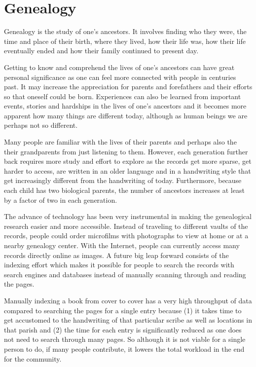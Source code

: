 
\section{Genealogy}

Genealogy is the study of one's ancestors. It involves finding who they were, the time and place of their birth, where they lived, how their life was, how their life eventually ended and how their family continued to present day.

Getting to know and comprehend the lives of one's ancestors can have great personal significance as one can feel more connected with people in centuries past. It may increase the appreciation for parents and forefathers and their efforts so that oneself could be born.
Experiences can also be learned from important events, stories and hardships in the lives of one's ancestors and
it becomes more apparent
how many things are different today, although as human beings we are perhaps not so different.

Many people are familiar with the lives of their parents and perhaps also the their grandparents from just listening to them.
However, each generation further back requires more study and effort to explore as the records get more sparse, get harder to access, are written in an older language and in a handwriting style that get increasingly different from the handwriting of today. Furthermore, because each child has two biological parents, the number of ancestors increases at least by a factor of two in each generation.

The advance of technology has been very instrumental in making the genealogical research easier and more accessible. Instead of traveling to different vaults of the records, people could order microfilms with photographs to view at home or at a nearby genealogy center. With the Internet, people can currently access many records directly online as images. A future big leap forward consists of the indexing effort which makes it possible for people to search the records with search engines and databases instead of manually scanning through and reading the pages.

Manually indexing a book from cover to cover has a very high throughput of data compared to searching the pages for a single entry because (1) it takes time to get accustomed to the handwriting of that particular scribe as well as locations in that parish and (2) the time for each entry is significantly reduced as one does not need to search through many pages. So although it is not viable for a single person to do, if many people contribute, it lowers the total workload in the end for the community.

